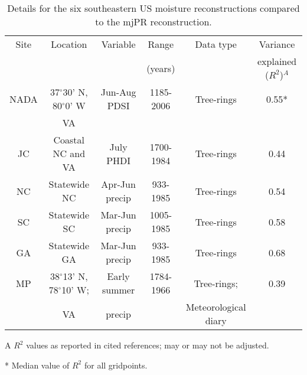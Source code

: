 \begin{landscape}
\begin{table}
  \begin{center}
    \begin{threeparttable}[b]
      \begin{tabular}{cccccc}
\toprule
Site & Location & Variable & Range   & Data type & Variance           \\
     &       &          & (years) &           & explained ($R^2$)$^A$  \\ \midrule
NADA \cite{cook1999drought}          & 37$^{\circ}$30' N, 80$^{\circ}$0' W   & Jun-Aug PDSI   & 1185-2006 & Tree-rings  & 0.55* \\  
                                     & VA                                    &                &           &             &       \\    
JC   \cite{stahle1998lost}           & Coastal NC and VA                     & July PHDI      & 1700-1984 & Tree-rings  & 0.44 \\ 
NC   \cite{stahle1992reconstruction} & Statewide NC                          & Apr-Jun precip & 933-1985  & Tree-rings  & 0.54 \\
SC   \cite{stahle1992reconstruction} & Statewide SC                          & Mar-Jun precip & 1005-1985 & Tree-rings  & 0.58 \\
GA   \cite{stahle1992reconstruction} & Statewide GA                          & Mar-Jun precip & 933-1985  & Tree-rings  & 0.68 \\
MP   \cite{druckenbrod2003late}      & 38$^{\circ}$13' N, 78$^{\circ}$10' W; & Early summer   & 1784-1966 & Tree-rings; & 0.39 \\ 
                                     & VA                                    & precip         &           & Meteorological diary \\ \bottomrule
      \end{tabular}
      \begin{tablenotes}
      \item [A] $R^2$ values as reported in cited references; may or may not be adjusted.
      \item [*] Median value of $R^2$ for all gridpoints.
      \end{tablenotes}
    \end{threeparttable}
  \end{center}
      \caption{Details for the six southeastern US moisture reconstructions compared to the mjPR reconstruction.}
  \label{table:reconDeets}
  \vspace{2cm}
\end{table}


\end{landscape}
